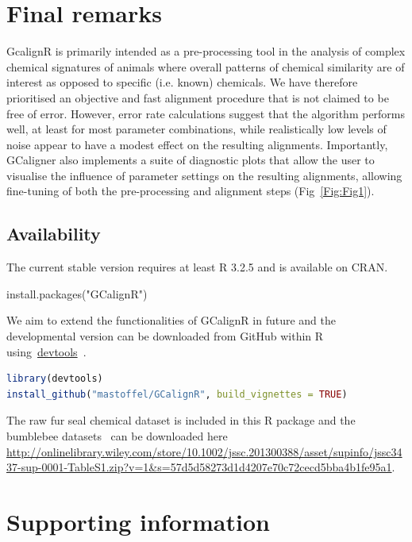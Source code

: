 \documentclass[10pt,letterpaper]{article}
\begin{document}
\section*{Final remarks}
GcalignR is primarily intended as a pre-processing tool in the analysis of complex chemical signatures of animals where overall patterns of chemical similarity are of interest as opposed to specific (i.e. known) chemicals. We have therefore prioritised an objective and fast alignment procedure that is not claimed to be free of error.  However, error rate calculations suggest that the algorithm performs well, at least for most parameter combinations, while realistically low levels of noise appear to have a modest effect on the resulting alignments. Importantly, GCaligner also implements a suite of diagnostic plots that allow the user to visualise the influence of parameter settings on the resulting alignments, allowing fine-tuning of both the pre-processing and alignment steps (Fig~\ref{Fig:Fig1}).

\subsection*{Availability}
The current stable version requires at least R 3.2.5 and is available on CRAN.

install.packages("GCalignR")

We aim to extend the functionalities of GCalignR in future and the developmental version can be downloaded from GitHub within R using~\href{https://cran.r-project.org/web/packages/devtools/index.html}{devtools}~\cite{Wickham.2016}. 

\begin{lstlisting}[language=R]
library(devtools)
install_github("mastoffel/GCalignR", build_vignettes = TRUE)
\end{lstlisting}

The raw fur seal chemical dataset is included in this R package and the bumblebee datasets~\cite{Dellicour.2013} can be downloaded here \url{http://onlinelibrary.wiley.com/store/10.1002/jssc.201300388/asset/supinfo/jssc3437-sup-0001-TableS1.zip?v=1&s=57d5d58273d1d4207e70c72cecd5bba4b1fe95a1}.

\section*{Supporting information}

\end{document}
